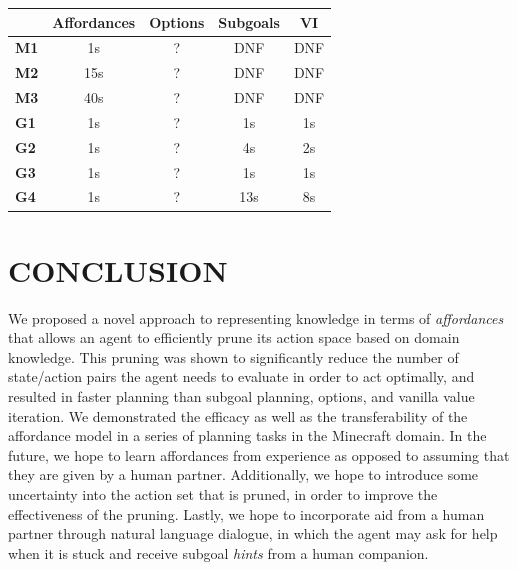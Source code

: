 \documentclass[]{article}
\begin{document}
\begin{tabular}{ l || c | c | c | c }
  & Affordances & Options & Subgoals & VI \\
  \hline
  {\bf M1} & 1s & ? & DNF & DNF  \\
  {\bf M2} & 15s & ? & DNF & DNF \\
  {\bf M3} & 40s & ? & DNF & DNF \\
  {\bf G1} & 1s & ? & 1s & 1s \\
  {\bf G2} & 1s & ? & 4s & 2s \\
  {\bf G3} & 1s & ? & 1s & 1s \\
  {\bf G4} & 1s & ? & 13s & 8s \\
\end{tabular}


\section{CONCLUSION}

We proposed a novel approach to representing
knowledge in terms of {\em
  affordances}~\citep{gibson77} that allows an agent to efficiently prune its
action space based on domain knowledge. This pruning was shown to significantly
reduce the number of state/action pairs the agent needs to evaluate
in order to act optimally, and resulted in faster planning than subgoal planning, options,
and vanilla value iteration. We demonstrated the efficacy as well as the 
transferability of the affordance model in a series of planning tasks in the Minecraft domain.
In the future, we hope to learn affordances from experience as opposed to assuming
that they are given by a human partner. Additionally, we hope to introduce some uncertainty
into the action set that is pruned, in order to improve the effectiveness of the pruning. Lastly,
we hope to incorporate aid from a human partner through natural language dialogue, in which
the agent may ask for help when it is stuck and receive subgoal {\it hints} from a human
companion.


  
\end{document}
